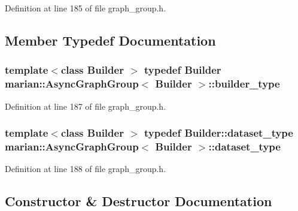 Definition at line 185 of file graph\+\_\+group.\+h.



\subsection{Member Typedef Documentation}
\subsubsection[{\texorpdfstring{builder\+\_\+type}{builder_type}}]{\setlength{\rightskip}{0pt plus 5cm}template$<$class Builder $>$ typedef Builder {\bf marian\+::\+Async\+Graph\+Group}$<$ Builder $>$\+::{\bf builder\+\_\+type}}\hypertarget{classmarian_1_1AsyncGraphGroup_a1e7d2c68e66fd37bde89d5cf340ccc7a}{}\label{classmarian_1_1AsyncGraphGroup_a1e7d2c68e66fd37bde89d5cf340ccc7a}


Definition at line 187 of file graph\+\_\+group.\+h.

\subsubsection[{\texorpdfstring{dataset\+\_\+type}{dataset_type}}]{\setlength{\rightskip}{0pt plus 5cm}template$<$class Builder $>$ typedef Builder\+::dataset\+\_\+type {\bf marian\+::\+Async\+Graph\+Group}$<$ Builder $>$\+::{\bf dataset\+\_\+type}}\hypertarget{classmarian_1_1AsyncGraphGroup_a94dd3794d340f8912f60a2c921a0dbf7}{}\label{classmarian_1_1AsyncGraphGroup_a94dd3794d340f8912f60a2c921a0dbf7}


Definition at line 188 of file graph\+\_\+group.\+h.



\subsection{Constructor \& Destructor Documentation}
